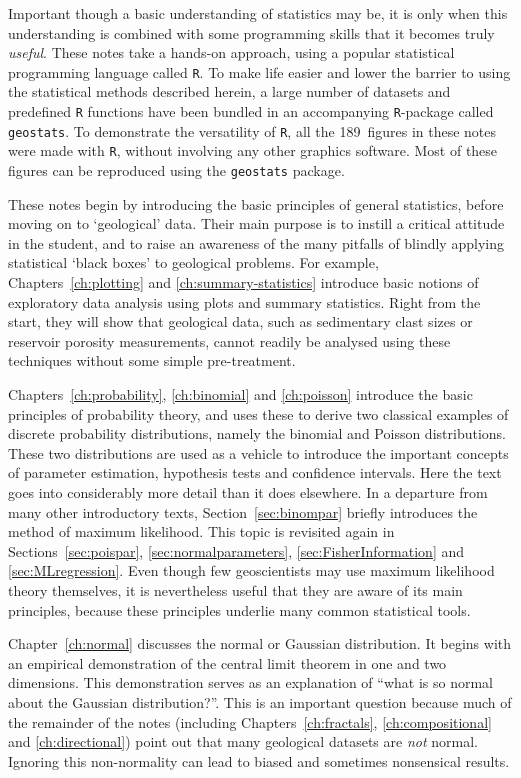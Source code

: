 Important though a basic understanding of statistics may be, it is
only when this understanding is combined with some programming skills
that it becomes truly \emph{useful}. These notes take a hands-on
approach, using a popular statistical programming language called
\texttt{R}.  To make life easier and lower the barrier to using the
statistical methods described herein, a large number of datasets and
predefined \texttt{R} functions have been bundled in an accompanying
\texttt{R}-package called \texttt{geostats}.  To demonstrate the
versatility of \texttt{R}, all the 189~figures in these notes were
made with \texttt{R}, without involving any other graphics
software. Most of these figures can be reproduced using the
\texttt{geostats} package.\medskip

These notes begin by introducing the basic principles of general
statistics, before moving on to `geological' data. Their main purpose
is to instill a critical attitude in the student, and to raise an
awareness of the many pitfalls of blindly applying statistical `black
boxes' to geological problems. For example, Chapters~\ref{ch:plotting}
and \ref{ch:summary-statistics} introduce basic notions of exploratory
data analysis using plots and summary statistics. Right from the
start, they will show that geological data, such as sedimentary clast
sizes or reservoir porosity measurements, cannot readily be analysed
using these techniques without some simple pre-treatment.\medskip

Chapters~\ref{ch:probability}, \ref{ch:binomial} and \ref{ch:poisson}
introduce the basic principles of probability theory, and uses these
to derive two classical examples of discrete probability
distributions, namely the binomial and Poisson distributions. These
two distributions are used as a vehicle to introduce the important
concepts of parameter estimation, hypothesis tests and confidence
intervals. Here the text goes into considerably more detail than it
does elsewhere. In a departure from many other introductory texts,
Section~\ref{sec:binompar} briefly introduces the method of maximum
likelihood. This topic is revisited again in
Sections~\ref{sec:poispar}, \ref{sec:normalparameters},
\ref{sec:FisherInformation} and \ref{sec:MLregression}. Even though
few geoscientists may use maximum likelihood theory themselves, it is
nevertheless useful that they are aware of its main principles,
because these principles underlie many common statistical tools.\medskip

Chapter~\ref{ch:normal} discusses the normal or Gaussian
distribution. It begins with an empirical demonstration of the central
limit theorem in one and two dimensions. This demonstration serves as
an explanation of ``what is so normal about the Gaussian
distribution?''.  This is an important question because much of the
remainder of the notes (including Chapters~\ref{ch:fractals},
\ref{ch:compositional} and \ref{ch:directional}) point out that many
geological datasets are \emph{not} normal. Ignoring this non-normality
can lead to biased and sometimes nonsensical results.\medskip

